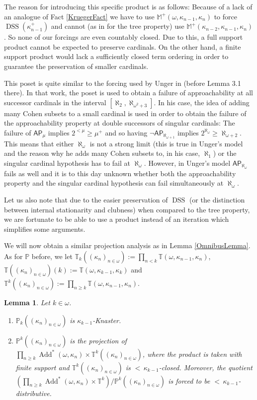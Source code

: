 \documentclass[12pt]{amsart}
\theoremstyle{definition}
\theoremstyle{remark}
\theoremstyle{plain}
\newtheorem{mylem}[mydef]{Lemma}
\numberwithin{mydef}{section}
\DeclareMathOperator{\Add}{Add}
\DeclareMathOperator{\DSS}{DSS}
\newcommand{\dM}{\mathbb{M}}
\newcommand{\dP}{\mathbb{P}}
\newcommand{\dT}{\mathbb{T}}
\newcommand{\AP}{\mathsf{AP}}
\begin{document}
	The reason for introducing this specific product is as follows: Because of a lack of an analogue of Fact \ref{KruegerFact} we have to use $\dM^+(\omega,\kappa_{n-1},\kappa_n)$ to force $\DSS(\kappa_{n-1}^+)$ and cannot (as in \cite{CumForeTreeProp} for the tree property) use $\dM^+(\kappa_{n-2},\kappa_{n-1},\kappa_n)$. So none of our forcings are even countably closed. Due to this, a full support product cannot be expected to preserve cardinals. On the other hand, a finite support product would lack a sufficiently closed term ordering in order to guarantee the preservation of smaller cardinals.
	
	This poset is quite similar to the forcing used by Unger in \cite{UngerSuccessiveApproach} (before Lemma 3.1 there). In that work, the poset is used to obtain a failure of approachability at all successor cardinals in the interval $[\aleph_2,\aleph_{\omega^2+3}]$. In his case, the idea of adding many Cohen subsets to a small cardinal is used in order to obtain the failure of the approachability property at double successors of singular cardinals: The failure of $\AP_{\mu}$ implies $2^{<\mu}\geq\mu^+$ and so having $\neg\AP_{\aleph_{\omega+1}}$ implies $2^{\aleph_{\omega}}\geq\aleph_{\omega+2}$. This means that either $\aleph_{\omega}$ is not a strong limit (this is true in Unger's model and the reason why he adds many Cohen subsets to, in his case, $\aleph_1$) or the singular cardinal hypothesis has to fail at $\aleph_{\omega}$. However, in Unger's model $\AP_{\aleph_{\omega}}$ fails as well and it is to this day unknown whether both the approachability property and the singular cardinal hypothesis can fail simultaneously at $\aleph_{\omega}$.
	
	Let us also note that due to the easier preservation of $\DSS$ (or the distinction between internal stationarity and clubness) when compared to the tree property, we are fortunate to be able to use a product instead of an iteration which simplifies some arguments.
	
	We will now obtain a similar projection analysis as in Lemma \ref{OmnibusLemma}. As for $\dP$ before, we let $\dT_k((\kappa_n)_{n\in\omega}):=\prod_{n<k}\dT(\omega,\kappa_{n-1},\kappa_n)$, $\dT((\kappa_n)_{n\in\omega})(k):=\dT(\omega,\kappa_{k-1},\kappa_k)$ and $\dT^k((\kappa_n)_{n\in\omega}):=\prod_{n\geq k}\dT(\omega,\kappa_{n-1},\kappa_n)$.
	
	\begin{mylem}\label{PDecomp}
		Let $k\in\omega$.
		\begin{enumerate}
			\item $\dP_k((\kappa_n)_{n\in\omega})$ is $\kappa_{k-1}$-Knaster.
			\item $\dP^k((\kappa_n)_{n\in\omega})$ is the projection of $\prod_{n\geq k}\Add^*(\omega,\kappa_n)\times\dT^k((\kappa_n)_{n\in\omega})$, where the product is taken with finite support and $\dT^k((\kappa_n)_{n\in\omega})$ is ${<}\,\kappa_{k-1}$-closed. Moreover, the quotient $(\prod_{n\geq k}\Add^*(\omega,\kappa_n)\times\dT^k)/\dP^k((\kappa_n)_{n\in\omega})$ is forced to be ${<}\,\kappa_{k-1}$-distributive.
		\end{enumerate}
	\end{mylem}
	
\end{document}
